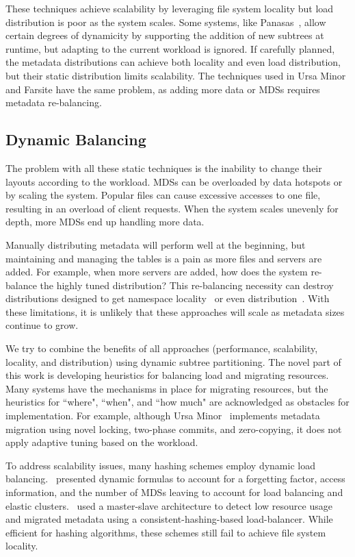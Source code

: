 These techniques achieve scalability by leveraging file system locality but load distribution is poor as the system scales. Some systems, like Panasas~\cite{welch:fast2008-panasas}, allow certain degrees of dynamicity by supporting the addition of new subtrees at runtime, but adapting to the current workload is ignored. If carefully planned, the metadata distributions can achieve both locality and even load distribution, but their static distribution limits scalability. The techniques used in Ursa Minor and Farsite have the same problem, as adding more data or MDSs requires metadata re-balancing. 

\subsection{Dynamic Balancing} 
The problem with all these static techniques is the inability to change their layouts according to the workload. MDSs can be overloaded by data hotspots or by scaling the system. Popular files can cause excessive accesses to one file, resulting in an overload of client requests. When the system scales unevenly for depth, more MDSs end up handling more data.

Manually distributing metadata will perform well at the beginning, but maintaining and managing the tables is a pain as more files and servers are added. For example, when more servers are added, how does the system re-balance the highly tuned distribution? This re-balancing necessity can destroy distributions designed to get namespace locality~\cite{sinnamohideen:atc2010-ursa} or even distribution~\cite{zhu:pds2008-hba}. With these limitations, it is unlikely that these approaches will scale as metadata sizes continue to grow. 

We try to combine the benefits of all approaches (performance, scalability, locality, and distribution) using dynamic subtree partitioning. The novel part of this work is developing heuristics for balancing load and migrating resources. Many systems have the mechanisms in place for migrating resources, but the heuristics for ``where", ``when", and ``how much" are acknowledged as obstacles for implementation. For example, although Ursa Minor~\cite{sinnamohideen:atc2010-ursa,weil:sc2004-dyn-metadata} implements metadata migration using novel locking, two-phase commits, and zero-copying, it does not apply adaptive tuning based on the workload.  

To address scalability issues, many hashing schemes employ dynamic load balancing.~\cite{li:msst2006-dynamic} presented dynamic formulas to account for a forgetting factor, access information, and the number of MDSs leaving to account for load balancing and elastic clusters.~\cite{xing:sc2009-skyfs} used a master-slave architecture to detect low resource usage and migrated metadata using a consistent-hashing-based load-balancer. While efficient for hashing algorithms, these schemes still fail to achieve file system locality. 

